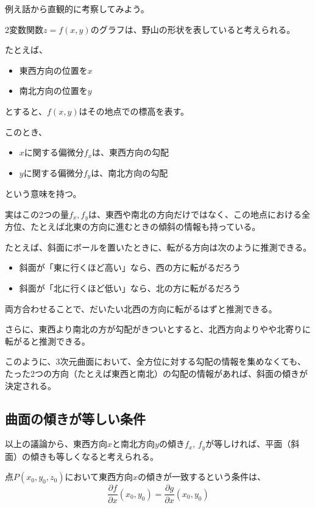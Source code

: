 \documentclass[../../../topic_calculus]{subfiles}
\begin{document}
例え話から直観的に考察してみよう。

\br

2変数関数$z=f(x,y)$のグラフは、野山の形状を表していると考えられる。

たとえば、
\begin{itemize}
  \item 東西方向の位置を$x$
  \item 南北方向の位置を$y$
\end{itemize}
とすると、$f(x,y)$はその地点での標高を表す。

\br

このとき、
\begin{itemize}
  \item $x$に関する偏微分$f_x$は、東西方向の勾配
  \item $y$に関する偏微分$f_y$は、南北方向の勾配
\end{itemize}
という意味を持つ。

\br

実はこの2つの量$f_x, f_y$は、東西や南北の方向だけではなく、この地点における全方位、たとえば北東の方向に進むときの傾斜の情報も持っている。

\br

たとえば、斜面にボールを置いたときに、転がる方向は次のように推測できる。
\begin{itemize}
  \item 斜面が「東に行くほど高い」なら、西の方に転がるだろう
  \item 斜面が「北に行くほど低い」なら、北の方に転がるだろう
\end{itemize}
両方合わせることで、だいたい北西の方向に転がるはずと推測できる。

さらに、東西より南北の方が勾配がきついとすると、北西方向よりやや北寄りに転がると推測できる。

\br

このように、3次元曲面において、全方位に対する勾配の情報を集めなくても、たった2つの方向（たとえば東西と南北）の勾配の情報があれば、斜面の傾きが決定される。

\subsection{曲面の傾きが等しい条件}

以上の議論から、東西方向$x$と南北方向$y$の傾き$f_x,\,f_y$が等しければ、平面（斜面）の傾きも等しくなると考えられる。

\br

点$P(x_0,y_0,z_0)$において東西方向$x$の傾きが一致するという条件は、
\begin{equation*}
  \frac{\partial f}{\partial x}(x_0,y_0) = \frac{\partial g}{\partial x}(x_0,y_0)
\end{equation*}
\end{document}
